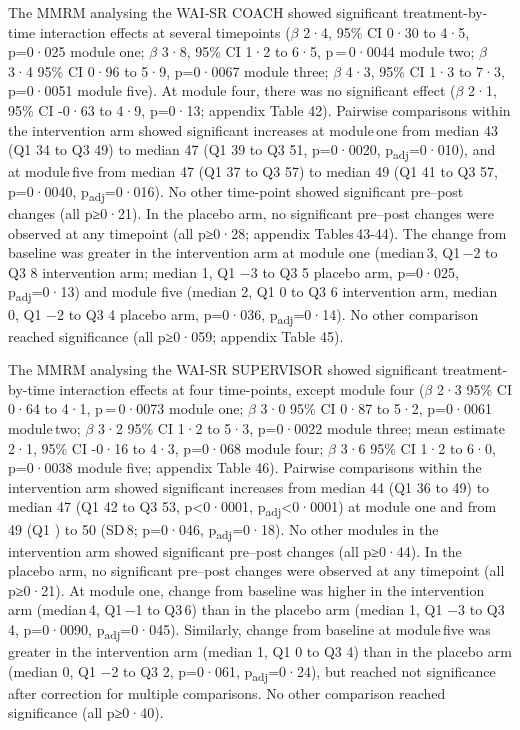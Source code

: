 \documentclass[
  super,
  preprint,
  1p,
  onecolumn]{elsarticle}
\begin{document}
The MMRM analysing the WAI‑SR COACH showed significant treatment-by-time
interaction effects at several timepoints (\(\beta\) 2·4, 95\% CI 0·30
to 4·5, p=0·025 module one; \(\beta\) 3·8, 95\% CI 1·2 to 6·5,
p\,=\,0·0044 module two; \(\beta\) 3·4 95\% CI 0·96 to 5·9, p=0·0067
module three; \(\beta\) 4·3, 95\% CI 1·3 to 7·3, p=0·0051 module five).
At module four, there was no significant effect (\(\beta\) 2·1, 95\% CI
-0·63 to 4·9, p=0·13; appendix Table 42). Pairwise comparisons within
the intervention arm showed significant increases at module\,one from
median 43 (Q1 34 to Q3 49) to median 47 (Q1 39 to Q3 51, p=0·0020,
p\textsubscript{adj}=0·010), and at module\,five from median 47 (Q1 37
to Q3 57) to median 49 (Q1 41 to Q3 57, p=0·0040,
p\textsubscript{adj}=0·016). No other time-point showed significant
pre--post changes (all p≥0·21). In the placebo arm, no significant
pre--post changes were observed at any timepoint (all p≥0·28; appendix
Tables\,43-44). The change from baseline was greater in the intervention
arm at module one (median\,3, Q1\,−2 to Q3 8 intervention arm; median 1,
Q1 −3 to Q3 5 placebo arm, p=0·025, p\textsubscript{adj}=0·13) and
module five (median 2, Q1 0 to Q3 6 intervention arm, median 0, Q1 −2 to
Q3 4 placebo arm, p=0·036, p\textsubscript{adj}=0·14). No other
comparison reached significance (all p≥0·059; appendix Table 45).

The MMRM analysing the WAI‑SR SUPERVISOR showed significant
treatment-by-time interaction effects at four time-points, except module
four (\(\beta\) 2·3 95\% CI 0·64 to 4·1, p\,=\,0·0073 module one;
\(\beta\) 3·0 95\% CI 0·87 to 5·2, p=0·0061 module\,two; \(\beta\) 3·2
95\% CI 1·2 to 5·3, p=0·0022 module three; mean estimate 2·1, 95\% CI
-0·16 to 4·3, p=0·068 module four; \(\beta\) 3·6 95\% CI 1·2 to 6·0,
p=0·0038 module five; appendix Table 46). Pairwise comparisons within
the intervention arm showed significant increases from median 44 (Q1 36
to 49) to median 47 (Q1 42 to Q3 53, p\textless0·0001,
p\textsubscript{adj}\textless0·0001) at module one and from 49 (Q1 ) to
50 (SD\,8; p=0·046, p\textsubscript{adj}=0·18). No other modules in the
intervention arm showed significant pre--post changes (all p≥0·44). In
the placebo arm, no significant pre--post changes were observed at any
timepoint (all p≥0·21). At module one, change from baseline was higher
in the intervention arm (median\,4, Q1\,−1 to Q3\,6) than in the placebo
arm (median 1, Q1 −3 to Q3 4, p=0·0090, p\textsubscript{adj}=0·045).
Similarly, change from baseline at module\,five was greater in the
intervention arm (median 1, Q1 0 to Q3 4) than in the placebo arm
(median 0, Q1 −2 to Q3 2, p=0·061, p\textsubscript{adj}=0·24), but
reached not significance after correction for multiple comparisons. No
other comparison reached significance (all p≥0·40).
\end{document}
